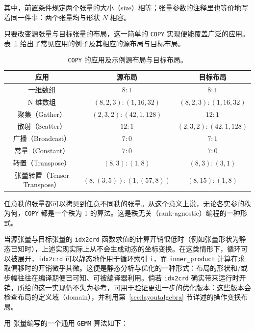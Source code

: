 \noindent 其中，前置条件规定两个张量的大小（size）相等；张量参数的注释里也等价地写着同一件事：两个张量均与形状 $N$ 相容。

只要改变源张量与目标张量的布局，这一简单的 \texttt{COPY} 实现便能覆盖广泛的应用。表~\ref{tab:copy} 给出了常见应用的例子及其相应的源布局与目标布局。

\begin{table}[ht]
\centering
\begin{tabular}{|c|c|c|}
\textbf{应用} & \textbf{源布局} & \textbf{目标布局} \\ \hline\hline
一维数组 & $8:1$ & $8:1$ \\ \hline
N 维数组 & $(8,2,3):(1,16,32)$ & $(8,2,3):(1,16,32)$ \\ \hline
聚集（Gather） & $(2,3,2):(42,1,128)$ & $12:1$\\ \hline
散射（Scatter） & $12:1$ & $(2,3,2):(42,1,128)$\\ \hline
广播（Broadcast） & $7:0$ & $7:1$\\ \hline
常量（Constant） & $7:0$ & $7:0$\\ \hline
转置（Transpose） & $(8,3):(1,8)$ & $(8,3):(3,1)$\\ \hline
张量转置（Tensor Transpose） & $(8,(3,5)):(1,(57,8))$ & $(8,15):(1,8)$\\ \hline
\end{tabular}
\caption{{\tt COPY} 的应用及示例源布局与目标布局。}
\label{tab:copy}
\end{table}

任意秩的张量都可以拷贝到任意不同秩的张量。从这个意义上说，无论各实参的秩为何，{\tt COPY} 都是一个秩为 1 的算法。这是秩无关（rank-agnostic）编程的一种形式。

当源张量与目标张量的 \texttt{idx2crd} 函数求值的计算开销很低时（例如张量形状为静态已知时），上述实现实际上从不会生成动态的坐标变换。在这类情形下，循环可以被展开，\texttt{idx2crd} 可以静态地作用于循环索引 \texttt{i}，而 \texttt{inner\_product} 计算在求取偏移时的开销微乎其微。这便是静态分析与优化的一种形式：布局的形状和/或步幅往往在编译期便已可知、可被编译器利用。倘若 \texttt{idx2crd} 确实带来运行时开销，所给的这一实现仍不失为参考，可用于验证更进一步的优化版本：这些版本会检查布局的定义域（domain），并利用第~\ref{sec:layoutalgebra} 节详述的操作变换布局。

\label{sec:gemm}

用 \CuTe 张量编写的一个通用 {\tt GEMM} 算法如下：

